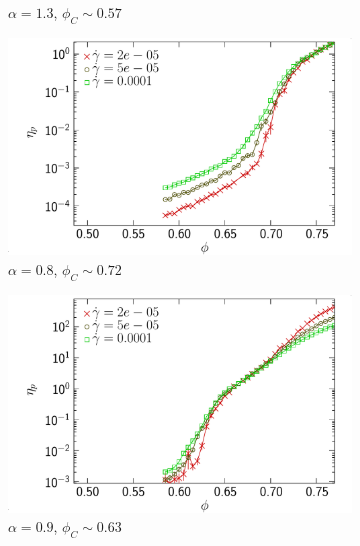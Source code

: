 \documentclass[class=report, float=false, crop=false]{standalone}
\begin{document}
\begin{figure}[h!]
\begin{subfigure}[t]{0.32\textwidth}
        \caption{$\alpha=1.3$, $\phi_C\sim0.57$}
        \label{bp_0064_KDk500_Ml100_EL130}
    \end{subfigure}
    
    \vspace{0pt}
    \begin{subfigure}[t]{0.32\textwidth}
        \centering
        \includegraphics[width=\textwidth]{figures/figs/etap_0064_KDk500_Ml100_EL080}
        \caption{$\alpha=0.8$, $\phi_C\sim0.72$}
        \label{etap_0064_KDk500_Ml100_EL080}
    \end{subfigure}
    \hfill
    \begin{subfigure}[t]{0.32\textwidth}
        \centering
        \includegraphics[width=\textwidth]{figures/figs/etap_0064_KDk500_Ml100_EL090}
        \caption{$\alpha=0.9$, $\phi_C\sim0.63$}
        \label{etap_0064_KDk500_Ml100_EL090}
    \end{subfigure}
    \hfill
    \begin{subfigure}[t]{0.32\textwidth}

\end{subfigure}
\end{figure}
\end{document}
